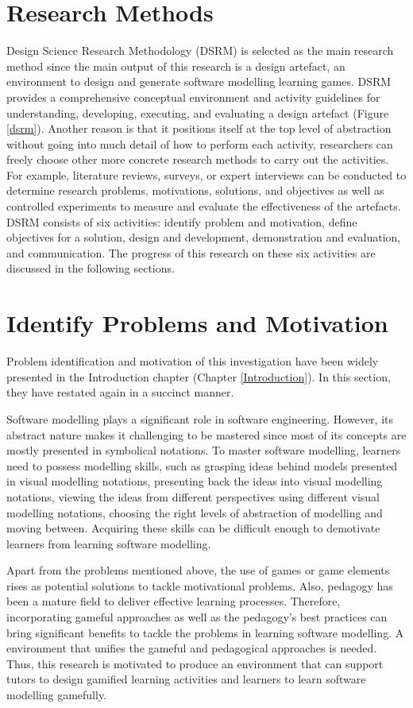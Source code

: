 \documentclass[10pt, a4paper]{report} \usepackage[titletoc]{appendix}
\begin{document}
\section{Research Methods}
\label{Research Methods}
Design Science Research Methodology (DSRM) is selected as the main research method since the main output of this research is a design artefact, an environment to design and generate software modelling learning games. DSRM provides a comprehensive conceptual environment and activity guidelines for understanding, developing, executing, and evaluating a design artefact (Figure \ref{dsrm}). Another reason is that it positions itself at the top level of abstraction without going into much detail of how to perform each activity, researchers can freely choose other more concrete research methods to carry out the activities. For example, literature reviews, surveys, or expert interviews can be conducted to determine research problems, motivations, solutions, and objectives as well as controlled experiments to measure and evaluate the effectiveness of the artefacts. DSRM consists of six activities: identify problem and motivation, define objectives for a solution, design and development, demonstration and evaluation, and communication. The progress of this research on these six activities are discussed in the following sections.

\section{Identify Problems and Motivation}
Problem identification and motivation of this investigation have been widely presented in the Introduction chapter (Chapter \ref{Introduction}). In this section, they have restated again in a succinct manner. 

Software modelling plays a significant role in software engineering. However, its abstract nature makes it challenging to be mastered since most of its concepts are mostly presented in symbolical notations. To master software modelling, learners need to possess modelling skills, such as grasping ideas behind models presented in visual modelling notations, presenting back the ideas into visual modelling notations, viewing the ideas from different perspectives using different visual modelling notations, choosing the right levels of abstraction of modelling and moving between. Acquiring these skills can be difficult enough to demotivate learners from learning software modelling.

Apart from the problems mentioned above, the use of games or game elements rises as potential solutions to tackle motivational problems. Also, pedagogy has been a mature field to deliver effective learning processes. Therefore, incorporating gameful approaches as well as the pedagogy's best practices can bring significant benefits to tackle the problems in learning software modelling. A environment that unifies the gameful and pedagogical approaches is needed.  Thus, this research is motivated to produce an environment that can support tutors to design gamified learning activities and learners to learn software modelling gamefully.
\end{document}
